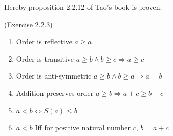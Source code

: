 Hereby proposition 2.2.12 of Tao's book is proven.
\begin{prop}
(Exercise 2.2.3) \label{exercise2.2.3}
\begin{enumerate}
\item Order is reflective $a \geq a$
\item Order is transitive $a \geq b \wedge b \geq c \Longrightarrow a \geq c$
\item Order is anti-symmetric $a \geq b \wedge b \geq a \Longrightarrow a=b$
\item Addition preserves order $a \geq b \Longrightarrow a+c \geq b+c$
\item $a<b \Longleftrightarrow S(a) \leq b$
\item $a<b$ Iff for positive natural number $c$, $b=a+c$
\end{enumerate}
\end{prop}
